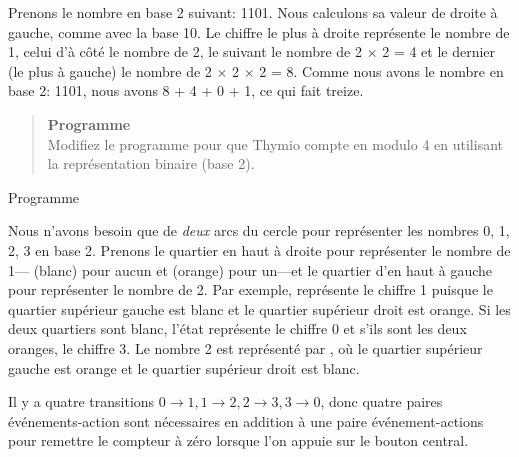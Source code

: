 Prenons le nombre en base 2 suivant: 1101.
Nous calculons sa valeur de droite à gauche, comme avec la base 10.
Le chiffre le plus à droite représente le nombre de 1, celui d'à côté le nombre de 2, le suivant le nombre de 2 $\times$ 2 = 4 et le dernier (le plus à gauche) le nombre de 2 $\times$ 2 $\times$ 2 = 8.
Comme nous avons le nombre en base 2: 1101, nous avons 8 + 4 + 0 + 1, ce qui fait treize.

\begin{quote}
\textbf{Programme}\\
Modifiez le programme pour que Thymio compte en modulo 4 en utilisant la représentation binaire (base 2).
\end{quote}

{\raggedleft \hfill Programme }

Nous n'avons besoin que de \emph{deux} arcs du cercle
pour représenter les nombres 0, 1, 2, 3 en base 2.
Prenons le quartier en haut à droite pour représenter
le nombre de 1--- (blanc) pour aucun et  (orange) pour un---et
le quartier d'en haut à gauche pour représenter le nombre de 2.
Par exemple,  représente le chiffre 1
puisque le quartier supérieur gauche est blanc
et le quartier supérieur droit est orange.
Si les deux quartiers sont blanc, l'état représente le chiffre 0 et s'ils sont les deux oranges, le chiffre 3.
Le nombre 2 est représenté par ,
où le quartier supérieur gauche est orange
et le quartier supérieur droit est blanc. 

Il y a quatre transitions $0\rightarrow 1, 1\rightarrow 2, 2
\rightarrow 3, 3\rightarrow 0$, donc quatre paires événements-action sont nécessaires en addition à une paire événement-actions pour remettre le compteur à zéro lorsque l'on appuie sur le bouton central.

\bigskip


\bigskip




